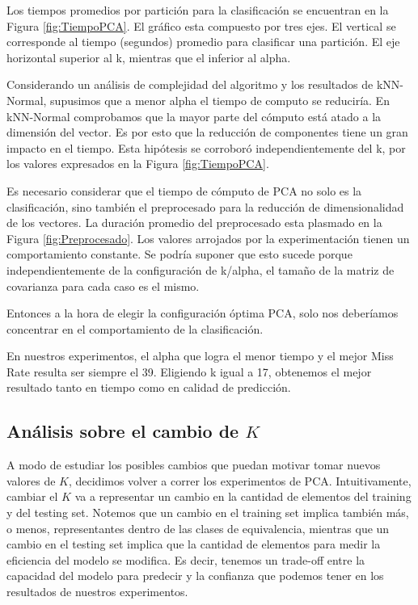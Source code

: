 \documentclass{article}
\begin{document}
Los tiempos promedios por partición para la clasificación se encuentran en la Figura \ref{fig:TiempoPCA}. El gráfico esta compuesto por tres ejes. El vertical se corresponde al tiempo (segundos) promedio para clasificar una partición. El eje horizontal superior al k, mientras que el inferior al alpha. 

Considerando un análisis de complejidad del algoritmo y los resultados de kNN-Normal, supusimos que a menor alpha el tiempo de computo se reduciría. En kNN-Normal comprobamos que la mayor parte del cómputo está atado a la dimensión del vector. Es por esto que la reducción de componentes tiene un gran impacto en el tiempo. Esta hipótesis se corroboró independientemente del k, por los valores expresados en la Figura \ref{fig:TiempoPCA}.

Es necesario considerar que el tiempo de cómputo de PCA no solo es la clasificación, sino también el preprocesado para la reducción de dimensionalidad de los vectores. La duración promedio del preprocesado esta plasmado en la Figura  \ref{fig:Preprocesado}. Los valores arrojados por la experimentación tienen un comportamiento constante. Se podría suponer que esto sucede porque independientemente de la configuración de k/alpha, el tamaño de la matriz de covarianza para cada caso es el mismo.

Entonces a la hora de elegir la configuración óptima PCA, solo nos deberíamos concentrar en el comportamiento de la clasificación.

En nuestros experimentos, el alpha que logra el menor tiempo y el mejor Miss Rate resulta ser siempre el 39. Eligiendo k igual a 17, obtenemos el mejor resultado tanto en tiempo como en calidad de predicción.

 
\subsection*{Análisis sobre el cambio de $K$}

A modo de estudiar los posibles cambios que puedan motivar tomar nuevos valores de $K$, decidimos volver a correr los experimentos de PCA. Intuitivamente, cambiar el $K$ va a representar un cambio en la cantidad de elementos del training y del testing set. Notemos que un cambio en el training set implica también más, o menos, representantes dentro de las clases de equivalencia, mientras que un cambio en el testing set implica que la cantidad de elementos para medir la eficiencia del modelo se modifica. Es decir, tenemos un trade-off entre la capacidad del modelo para predecir y la confianza que podemos tener en los resultados de nuestros experimentos.
\end{document}
